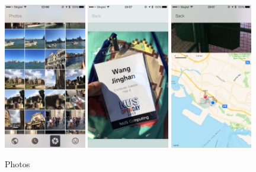 \documentclass[12pt,a4paper]{article}
\begin{document}
            \begin{figure}
                \includegraphics[width=0.32\textwidth]{4-1-6-a}
                \includegraphics[width=0.32\textwidth]{4-1-6-b}
                \includegraphics[width=0.32\textwidth]{4-1-6-c}
                \centering
                \caption{Photos}
                \label{fig:photos}
            \end{figure}
            
\end{document}
